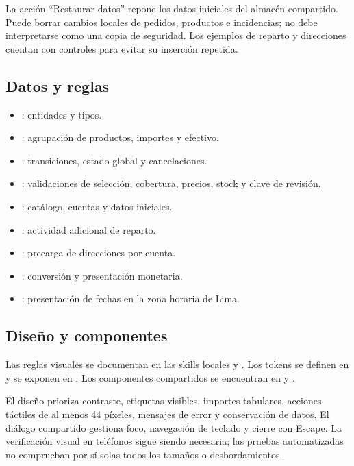 \documentclass[12pt,letterpaper]{article}
\newcommand{\codigo}[1]{\texttt{\detokenize{#1}}}
\begin{document}
La acción ``Restaurar datos'' repone los datos iniciales del almacén compartido. Puede borrar cambios locales de pedidos, productos e incidencias; no debe interpretarse como una copia de seguridad. Los ejemplos de reparto y direcciones cuentan con controles para evitar su inserción repetida.

\subsection{Datos y reglas}

\begin{itemize}
  \item {}: entidades y tipos.
  \item {}: agrupación de productos, importes y efectivo.
  \item {}: transiciones, estado global y cancelaciones.
  \item {}: validaciones de selección, cobertura, precios, stock y clave de revisión.
  \item {}: catálogo, cuentas y datos iniciales.
  \item {}: actividad adicional de reparto.
  \item {}: precarga de direcciones por cuenta.
  \item {}: conversión y presentación monetaria.
  \item {}: presentación de fechas en la zona horaria de Lima.
\end{itemize}

\subsection{Diseño y componentes}

Las reglas visuales se documentan en las skills locales \codigo{quickly-ui} y \codigo{ux-principles-reviewer}. Los tokens se definen en  y se exponen en . Los componentes compartidos se encuentran en  y .

El diseño prioriza contraste, etiquetas visibles, importes tabulares, acciones táctiles de al menos 44 píxeles, mensajes de error y conservación de datos. El diálogo compartido gestiona foco, navegación de teclado y cierre con Escape. La verificación visual en teléfonos sigue siendo necesaria; las pruebas automatizadas no comprueban por sí solas todos los tamaños o desbordamientos.
\end{document}

